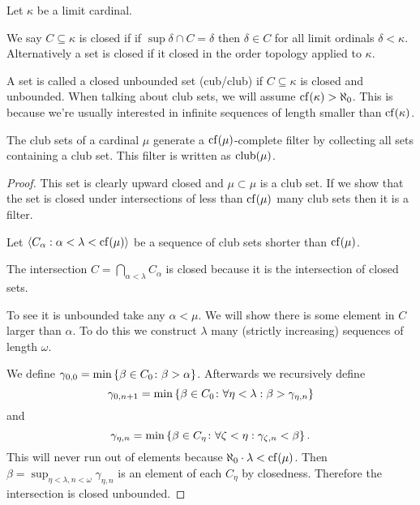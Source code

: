 \begin{definition}
    Let \(\kappa\) be a limit cardinal.

    We say \(C\subseteq\kappa\) is closed if if \(\sup\delta\cap C=\delta\) then
    \(\delta\in C\) for all limit ordinals \(\delta<\kappa\). Alternatively a
    set is closed if it closed in the order topology applied to \(\kappa\).

    A set is called a closed unbounded set (cub/club) if \(C\subseteq\kappa\) is
    closed and unbounded. When talking about club sets, we will assume
    \(\operatorname{cf}(\kappa)>\aleph_{0}\). This is because we're usually interested
    in infinite sequences of length smaller than \(\operatorname{cf}(\kappa)\).
\end{definition}

\begin{proposition}
    The club sets of a cardinal \(\mu\) generate a \(\operatorname{cf}(\mu)\)-complete filter
    by collecting all sets containing a club set. This filter is written as
    \(\operatorname{club}(\mu)\).

    \begin{proof}
        This set is clearly upward closed and \(\mu\subset\mu\) is a club set.
        If we show that the set is closed under intersections of less than
        \(\operatorname{cf}(\mu)\) many club sets then it is a filter.

        Let \(\left<C_{\alpha}:\alpha<\lambda<\operatorname{cf}(\mu)\right>\) be a sequence of club
        sets shorter than \(\operatorname{cf}(\mu)\).

        The intersection \(C=\bigcap_{\alpha<\lambda}C_{\alpha}\) is closed
        because it is the intersection of closed sets.

        To see it is unbounded take any \(\alpha<\mu\). We will show there is
        some element in \(C\) larger than \(\alpha\). To do this we construct
        \(\lambda\) many (strictly increasing) sequences of length \(\omega\).

        We define \(\gamma_{0,0}=\min\left\{\beta\in C_{0}\colon\beta>\alpha\right\}\).
        Afterwards we recursively define
        \[
            \gamma_{0,n+1}=\min\left\{\beta\in C_{0}\colon\forall\eta<\lambda:\beta>\gamma_{\eta,n}\right\}
        \]
        and
        \[
            \gamma_{\eta,n}=\min\left\{\beta\in C_{\eta}\colon\forall\zeta<\eta:\gamma_{\zeta,n}<\beta\right\}.
        \]
        This will never run out of elements because
        \(\aleph_{0}\cdot\lambda<\operatorname{cf}(\mu)\). Then
        \(\beta=\sup_{\eta<\lambda,n<\omega}\gamma_{\eta,n}\) is an element of
        each \(C_{\eta}\) by closedness. Therefore the intersection is closed
        unbounded.
    \end{proof}
\end{proposition}

